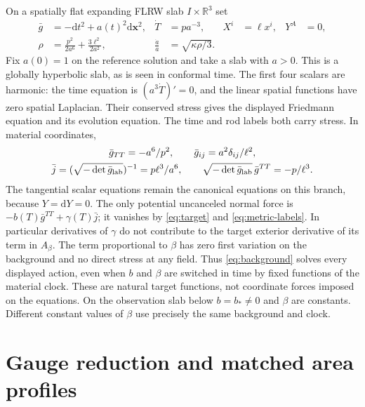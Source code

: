 \documentclass[11pt]{article}
\newcommand{\dd}{\mathrm d}
\begin{document}
On a spatially flat expanding FLRW slab $I\times\mathbb R^3$ set
\begin{align}
 \bar g&=-\dd t^2+a(t)^2\dd\mathbf x^2, & \dot T&=pa^{-3},
 &X^i&=\ell x^i,&Y^A&=0,\nonumber\\[-1mm]
 \rho&=\tfrac{p^2}{2a^6}+\tfrac{3\ell^2}{2a^2},&
 \frac{\dot a}{a}&=\sqrt{\kappa\rho/3}.                                  \label{eq:background}
\end{align}
Fix $a(0)=1$ on the reference solution and take a slab with $a>0$. This is a globally hyperbolic slab, as is seen in conformal time. The first four scalars are harmonic: the time equation is $(a^3\dot T)'=0$, and the linear spatial functions have zero spatial Laplacian. Their conserved stress gives the displayed Friedmann equation and its evolution equation. The time and rod labels both carry stress. In material coordinates,
\begin{equation}\label{eq:metric-labels}
\begin{gathered}
 \bar g_{TT}=-a^6/p^2,\qquad \bar g_{ij}=a^2\delta_{ij}/\ell^2,\\
 \bar j=(\sqrt{-\det\bar g_{\rm lab}})^{-1}=p\ell^3/a^6,
 \qquad \sqrt{-\det\bar g_{\rm lab}}\,\bar g^{TT}=-p/\ell^3.
\end{gathered}
\end{equation}
The tangential scalar equations remain the canonical equations on this branch, because $Y=\dd Y=0$. The only potential uncanceled normal force is $-b(T)\bar g^{TT}+\gamma(T)\bar j$; it vanishes by \eqref{eq:target} and \eqref{eq:metric-labels}. In particular derivatives of $\gamma$ do not contribute to the target exterior derivative of its term in $A_\beta$. The term proportional to $\beta$ has zero first variation on the background and no direct stress at any field. Thus \eqref{eq:background} solves every displayed action, even when $b$ and $\beta$ are switched in time by fixed functions of the material clock. These are natural target functions, not coordinate forces imposed on the equations. On the observation slab below $b=b_*\ne0$ and $\beta$ are constants. Different constant values of $\beta$ use precisely the same background and clock.

\section{Gauge reduction and matched area profiles}\label{sec:areas}
\end{document}
